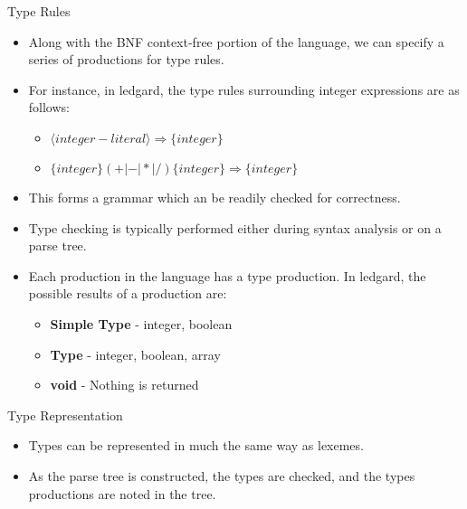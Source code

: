 \documentclass[]{beamer}
\begin{document}
\begin{frame}{Type Rules}
    \begin{itemize}[<+->]
        \item Along with the BNF context-free portion of the language,
            we can specify a series of productions for type rules.
        \item For instance, in ledgard, the type rules surrounding
            integer expressions are as follows:  
            \begin{itemize}
                \item $\langle integer-literal \rangle \Rightarrow \{integer\}$
                \item $\{integer\} (+ | - | * | /) \{integer\} \Rightarrow \{integer\}$ 
            \end{itemize}
        \item This forms a grammar which an be readily checked
            for correctness.
        \item Type checking is typically performed either during
            syntax analysis or on a parse tree.
        \item Each production in the language has a type production.
            In ledgard, the possible results of a production are:
            \begin{itemize}
                \item \textbf{Simple Type} - integer, boolean
                \item \textbf{Type} - integer, boolean, array
                \item \textbf{void} - Nothing is returned
            \end{itemize}
    \end{itemize}
\end{frame}

\begin{frame}{Type Representation}
    \begin{itemize}[<+->]
        \item Types can be represented in much the same way as
            lexemes.
        \item As the parse tree is constructed, the types are
            checked, and the types productions are noted in the tree.
    \end{itemize}
\end{frame}
\end{document}
